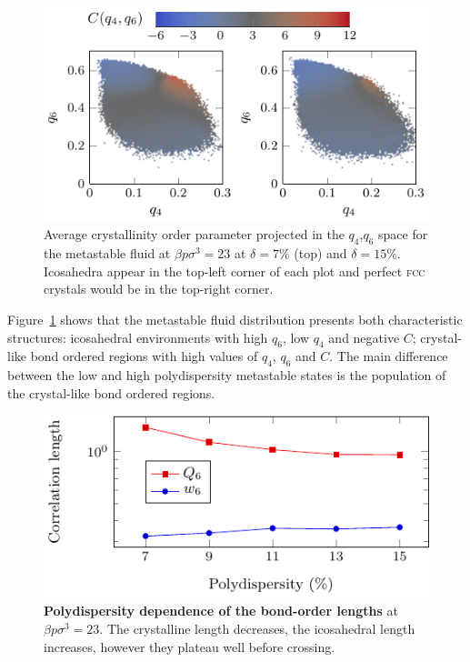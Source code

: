 \documentclass[twocolumn,superscriptaddress]{revtex4-1}
\begin{document}
\begin{figure}
 \centering
 \includegraphics{fig_Cmaps}
 \caption{Average crystallinity order parameter projected in the $q_4$,$q_6$ space for the metastable fluid at $\beta p\sigma^3=23$ at $\delta=7\%$ (top) and $\delta=15\%$. Icosahedra appear in the top-left corner of each plot and perfect \textsc{fcc} crystals would be in the top-right corner.}
 \label{fig:Cmaps}
\end{figure}


Figure~\ref{fig:Cmaps} shows that the metastable fluid distribution presents both characteristic
structures: icosahedral environments with high $q_6$, low $q_4$ and negative $C$; crystal-like bond ordered regions with high values of
$q_4$, $q_6$ and $C$. The main difference between the low and
high polydispersity metastable states is the population of the crystal-like bond ordered regions.


\begin{figure}
 \centering
 \includegraphics{fig_lengthpoly}
	\caption{\textbf{Polydispersity dependence of the bond-order lengths} at $\beta p\sigma^3=23$. The crystalline length decreases, the icosahedral length increases, however they plateau well before crossing.}
	\label{fig:lengthpoly}
\end{figure}
\end{document}
